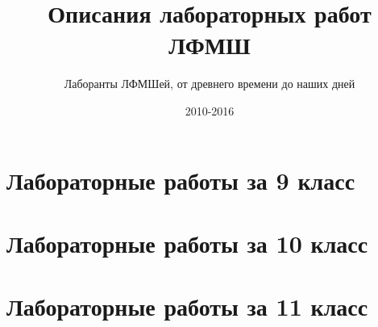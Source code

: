 \documentclass[a4paper,10pt]{book}
\title{Описания лабораторных работ ЛФМШ}
\date{2010-2016}
\author{Лаборанты ЛФМШей, от древнего времени до наших дней}
\begin{document}
\maketitle
\tableofcontents
\chapter{Лабораторные работы за 9 класс}

\chapter{Лабораторные работы за 10 класс}

\chapter{Лабораторные работы за 11 класс}

\end{document}

